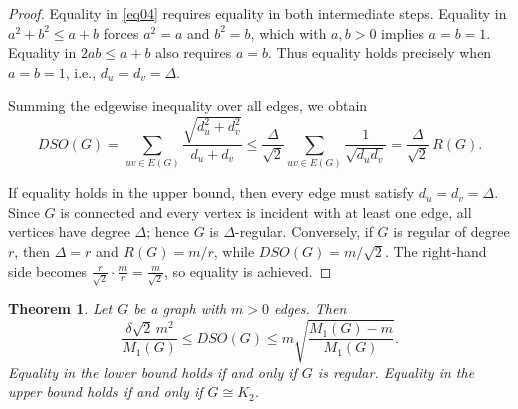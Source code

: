 \documentclass{article}
\newtheorem{theorem}{Theorem}
\theoremstyle{definition}
\begin{document}
\begin{proof}
Equality in \eqref{eq04} requires equality in both intermediate steps.
Equality in $a^2+b^2 \le a+b$ forces $a^2=a$ and $b^2=b$, which with $a,b>0$ implies $a=b=1$.
Equality in $2ab \le a+b$ also requires $a=b$.  Thus equality holds precisely when $a=b=1$, i.e., $d_u = d_v = \Delta$.

Summing the edgewise inequality over all edges, we obtain
\[
DSO(G) = \sum_{uv\in E(G)} \frac{\sqrt{d_u^2+d_v^2}}{d_u+d_v}
      \le \frac{\Delta}{\sqrt{2}} \sum_{uv\in E(G)} \frac{1}{\sqrt{d_u d_v}}
      = \frac{\Delta}{\sqrt{2}}\,R(G).
\]

If equality holds in the upper bound, then every edge must satisfy $d_u = d_v = \Delta$.  Since $G$ is connected and every vertex is incident with at least one edge, all vertices have degree $\Delta$; hence $G$ is $\Delta$-regular.
Conversely, if $G$ is regular of degree $r$, then $\Delta = r$ and $R(G) = m/r$, while $DSO(G) = m/\sqrt{2}$.  The right‑hand side becomes $\frac{r}{\sqrt{2}}\cdot\frac{m}{r} = \frac{m}{\sqrt{2}}$, so equality is achieved.
\end{proof}

\begin{theorem}\label{DSO-M1}
Let $G$ be a graph with $m>0$ edges. Then
\[
\frac{\delta\sqrt{2}\,m^2}{M_1(G)} \le DSO(G) \le m\sqrt{\frac{M_1(G)-m}{M_1(G)}}.
\]
Equality in the lower bound holds if and only if $G$ is regular.
Equality in the upper bound holds if and only if $G\cong K_2$.
\end{theorem}
\end{document}

